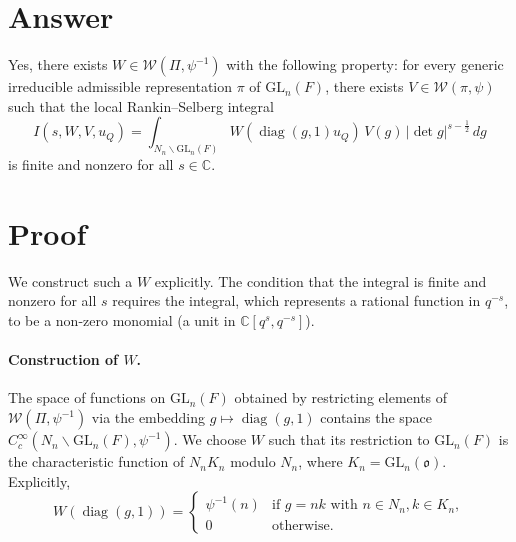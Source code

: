 \documentclass[12pt]{article}
\theoremstyle{plain}
\newcommand{\GL}{\mathrm{GL}}
\newcommand{\C}{\mathbb{C}}
\newcommand{\oo}{\mathfrak{o}}
\begin{document}
\section*{Answer}

Yes, there exists \(W \in \mathcal{W}(\Pi, \psi^{-1})\) with the following property: for every generic irreducible admissible representation \(\pi\) of \(\GL_n(F)\), there exists \(V \in \mathcal{W}(\pi, \psi)\) such that the local Rankin--Selberg integral
\[
  I(s, W, V, u_Q) = \int_{N_n \backslash \GL_{n}(F)} W(\operatorname{diag}(g,1) u_Q)\,V(g)\,|\det g|^{s-\frac12}\,dg
\]
is finite and nonzero for all \(s \in \C\).

\section*{Proof}

We construct such a \(W\) explicitly. The condition that the integral is finite and nonzero for all \(s\) requires the integral, which represents a rational function in \(q^{-s}\), to be a non-zero monomial (a unit in \(\C[q^s, q^{-s}]\)).

\paragraph{Construction of \(W\).}
The space of functions on \(\GL_n(F)\) obtained by restricting elements of \(\mathcal{W}(\Pi, \psi^{-1})\) via the embedding \(g \mapsto \operatorname{diag}(g, 1)\) contains the space \(C_c^\infty(N_n \backslash \GL_n(F), \psi^{-1})\). We choose \(W\) such that its restriction to \(\GL_n(F)\) is the characteristic function of \(N_n K_n\) modulo \(N_n\), where \(K_n = \GL_n(\oo)\). Explicitly,
\[
W(\operatorname{diag}(g, 1)) = \begin{cases} \psi^{-1}(n) & \text{if } g = nk \text{ with } n \in N_n, k \in K_n, \\ 0 & \text{otherwise}. \end{cases}
\]
\end{document}
